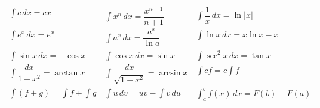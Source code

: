 \begin{center}
\renewcommand{\arraystretch}{2.2}\setlength{\tabcolsep}{10pt}
\begin{tabular}{lll}
	$\int c\,dx = cx$ & $\int x^n\,dx = \dfrac{x^{n+1}}{n+1}$ & $\int \dfrac{1}{x}\,dx = \ln|x|$ \\[6pt]
	$\int e^x\,dx = e^x$ & $\int a^x\,dx = \dfrac{a^x}{\ln a}$ & $\int \ln x\,dx = x\ln x - x$ \\
	$\int \sin x\,dx = -\cos x$ & $\int \cos x\,dx = \sin x$ & $\int \sec^2 x\,dx = \tan x$ \\[6pt]
	$\int \dfrac{dx}{1+x^2} = \arctan x$ & $\int \dfrac{dx}{\sqrt{1-x^2}} = \arcsin x$ & $\int c f = c\int f$ \\[6pt]
	$\int (f \pm g) = \int f \pm \int g$ & $\int u\,dv = uv - \int v\,du$ & $\int_a^b f(x)\,dx = F(b) - F(a)$ \\
\end{tabular}
\end{center}
